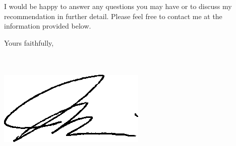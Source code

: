 \documentclass[11pt]{moderncv}        %
\begin{document}
I would be happy to answer any questions you may have or to discuss my
recommendation in further detail. Please feel free to contact me at the
information provided below.

\vspace{1cm}
\closing{Yours faithfully,\\
	 \\
}
\\
\includegraphics[scale=0.35]{images/mich_signature.png}\\
\\
\\
\end{document}
